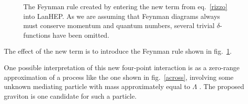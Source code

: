 \begin{figure}[htp]\begin{center}
{\footnotesize{}
}\end{center}
\caption{The Feynman rule created by entering the new term from eq.~\eqref{rizzo} into LanHEP\cite{lanhep}. As we are assuming that Feynman diagrams always must conserve momentum and quantum numbers, several trivial $\delta$-functions have been omitted. \label{rule}}
\end{figure}

The effect of the new term is to introduce the Feynman rule shown in fig.~\ref{rule}.



One possible interpretation of this new four-point interaction is as a zero-range approximation of a process like the one shown in fig.~\ref{across}, involving some unknown mediating particle with mass approximately equal to $\Lambda$ \cite{marshaw}. The proposed graviton is one candidate for such a particle.

